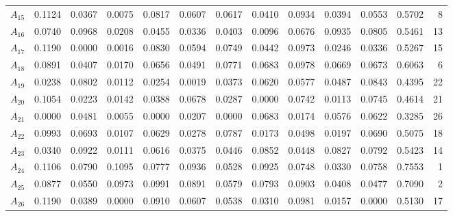 \documentclass[final,5p,times,twocolumn,authoryear]{elsarticle}
\begin{document}
\begin{table}[ht!]
{\begin{tabular}{lrrrrrrrrrrrr}
$A_{15}$ & 0.1124 & 0.0367 & 0.0075 & 0.0817 & 0.0607 & 0.0617 & 0.0410 & 0.0934 & 0.0394 & 0.0553 & 0.5702 & 8 \\
$A_{16}$ & 0.0740 & 0.0968 & 0.0208 & 0.0455 & 0.0336 & 0.0403 & 0.0096 & 0.0676 & 0.0935 & 0.0805 & 0.5461 & 13 \\
$A_{17}$ & 0.1190 & 0.0000 & 0.0016 & 0.0830 & 0.0594 & 0.0749 & 0.0442 & 0.0973 & 0.0246 & 0.0336 & 0.5267 & 15 \\
$A_{18}$ & 0.0891 & 0.0407 & 0.0170 & 0.0656 & 0.0491 & 0.0771 & 0.0683 & 0.0978 & 0.0669 & 0.0673 & 0.6063 & 6 \\
$A_{19}$ & 0.0238 & 0.0802 & 0.0112 & 0.0254 & 0.0019 & 0.0373 & 0.0620 & 0.0577 & 0.0487 & 0.0843 & 0.4395 & 22 \\
$A_{20}$ & 0.1054 & 0.0223 & 0.0142 & 0.0388 & 0.0678 & 0.0287 & 0.0000 & 0.0742 & 0.0113 & 0.0745 & 0.4614 & 21 \\
$A_{21}$ & 0.0000 & 0.0481 & 0.0055 & 0.0000 & 0.0207 & 0.0000 & 0.0683 & 0.0174 & 0.0576 & 0.0622 & 0.3285 & 26 \\
$A_{22}$ & 0.0993 & 0.0693 & 0.0107 & 0.0629 & 0.0278 & 0.0787 & 0.0173 & 0.0498 & 0.0197 & 0.0690 & 0.5075 & 18 \\
$A_{23}$ & 0.0340 & 0.0922 & 0.0111 & 0.0616 & 0.0375 & 0.0446 & 0.0852 & 0.0448 & 0.0827 & 0.0792 & 0.5423 & 14 \\
$A_{24}$ & 0.1106 & 0.0790 & 0.1095 & 0.0777 & 0.0936 & 0.0528 & 0.0925 & 0.0748 & 0.0330 & 0.0758 & 0.7553 & 1 \\
$A_{25}$ & 0.0877 & 0.0550 & 0.0973 & 0.0991 & 0.0891 & 0.0579 & 0.0793 & 0.0903 & 0.0408 & 0.0477 & 0.7090 & 2 \\
$A_{26}$ & 0.1190 & 0.0389 & 0.0000 & 0.0910 & 0.0607 & 0.0538 & 0.0310 & 0.0981 & 0.0157 & 0.0000 & 0.5130 & 17 \\ \bottomrule
\end{tabular}
}
\end{table}
%
\end{document}
